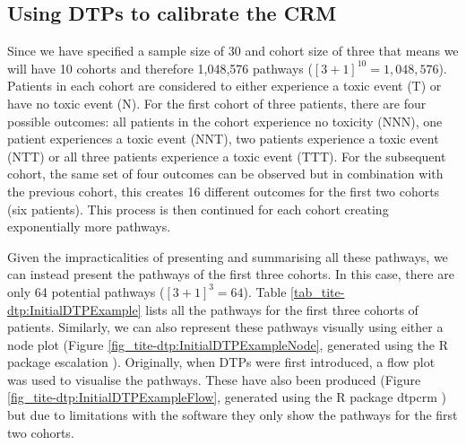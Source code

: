 \subsection{Using DTPs to calibrate the CRM}
\label{tite-dtp:UsingDTPs-Calibration}

Since we have specified a sample size of 30 and cohort size of three that means we will have 10 cohorts and therefore 1,048,576 pathways ($[3+1]^{10} = 1,048,576$). Patients in each cohort are considered to either experience a toxic event (T) or have no toxic event (N). For the first cohort of three patients, there are four possible outcomes: all patients in the cohort experience no toxicity (NNN), one patient experiences a toxic event (NNT), two patients experience a toxic event (NTT) or all three patients experience a toxic event (TTT). For the subsequent cohort, the same set of four outcomes can be observed but in combination with the previous cohort, this creates 16 different outcomes for the first two cohorts (six patients). This process is then continued for each cohort creating exponentially more pathways. 

Given the impracticalities of presenting and summarising all these pathways, we can instead present the pathways of the first three cohorts. In this case, there are only 64 potential pathways ($[3+1]^{3} = 64$). Table \ref{tab_tite-dtp:InitialDTPExample} lists all the pathways for the first three cohorts of patients. Similarly, we can also represent these pathways visually using either a node plot (Figure \ref{fig_tite-dtp:InitialDTPExampleNode}, generated using the R package escalation \cite{brockModularApproachDose2020}). Originally, when DTPs were first introduced, a flow plot was used to visualise the pathways. These have also been produced (Figure \ref{fig_tite-dtp:InitialDTPExampleFlow}, generated using the R package dtpcrm \cite{yapDtpcrmDoseTransition2019}) but due to limitations with the software they only show the pathways for the first two cohorts. 

